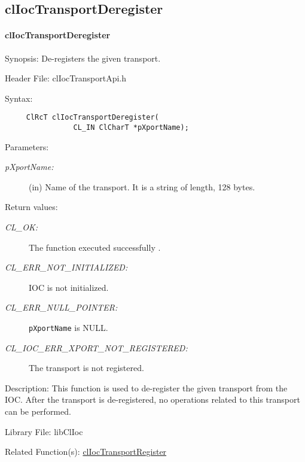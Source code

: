 \begin{flushleft}
\subsection{clIocTransportDeregister}
\hypertarget{pageioc302}{}\paragraph{cl\-Ioc\-Transport\-Deregister}\label{pageioc302}
\begin{Desc}
\item[Synopsis:]De-registers the given transport.\end{Desc}
\begin{Desc}
\item[Header File:]clIocTransportApi.h\end{Desc}
\begin{Desc}
\item[Syntax:]

\footnotesize\begin{verbatim}     ClRcT clIocTransportDeregister(
                CL_IN ClCharT *pXportName);
\end{verbatim}
\normalsize
\end{Desc}
\begin{Desc}
\item[Parameters:]
\begin{description}
\item[{\em p\-Xport\-Name:}](in) Name of the transport. It is a string of length, 128 bytes.\end{description}
\end{Desc}
\begin{Desc}
\item[Return values:]
\begin{description}
\item[{\em CL\_\-OK:}]The function executed successfully . 
\item[{\em CL\_\-ERR\_\-NOT\_\-INITIALIZED:}] IOC is not initialized. 
\item[{\em CL\_\-ERR\_\-NULL\_\-POINTER:}]{\tt{pXportName}} is NULL. 
\item[{\em CL\_\-IOC\_\-ERR\_\-XPORT\_\-NOT\_\-REGISTERED:}]The transport is not registered.\end{description}
\end{Desc}
\begin{Desc}
\item[Description:]This function is used to de-register the given transport from the IOC. After the transport is de-registered, no operations related to
this transport can be performed.\end{Desc}
\begin{Desc}
\item[Library File:]libClIoc\end{Desc}
\begin{Desc}
\item[Related Function(s):]\hyperlink{pageioc118}{cl\-Ioc\-Transport\-Register} \end{Desc}
\newpage



\end{flushleft}
